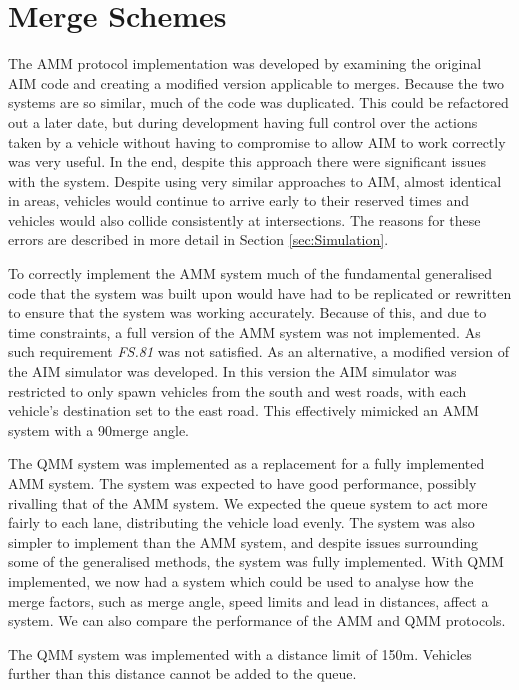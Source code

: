 \section{Merge Schemes}
\label{sec:Merge Schemes}
The AMM protocol implementation was developed by examining the original AIM code and creating a modified version applicable to merges. Because the two systems are so similar, much of the code was duplicated. This could be refactored out a later date, but during development having full control over the actions taken by a vehicle without having to compromise to allow AIM to work correctly was very useful. In the end, despite this approach there were significant issues with the system. Despite using very similar approaches to AIM, almost identical in areas, vehicles would continue to arrive early to their reserved times and vehicles would also collide consistently at intersections. The reasons for these errors are described in more detail in Section \ref{sec:Simulation}.

To correctly implement the AMM system much of the fundamental generalised code that the system was built upon would have had to be replicated or rewritten to ensure that the system was working accurately. Because of this, and due to time constraints, a full version of the AMM system was not implemented. As such requirement \emph{FS.81} was not satisfied. As an alternative, a modified version of the AIM simulator was developed. In this version the AIM simulator was restricted to only spawn vehicles from the south and west roads, with each vehicle's destination set to the east road. This effectively mimicked an AMM system with a 90\degree merge angle.

The QMM system was implemented as a replacement for a fully implemented AMM system. The system was expected to have good performance, possibly rivalling that of the AMM system. We expected the queue system to act more fairly to each lane, distributing the vehicle load evenly. The system was also simpler to implement than the AMM system, and despite issues surrounding some of the generalised methods, the system was fully implemented. With QMM implemented, we now had a system which could be used to analyse how the merge factors, such as merge angle, speed limits and lead in distances, affect a system. We can also compare the performance of the AMM and QMM protocols.

The QMM system was implemented with a distance limit of 150\si{m}. Vehicles further than this distance cannot be added to the queue.

